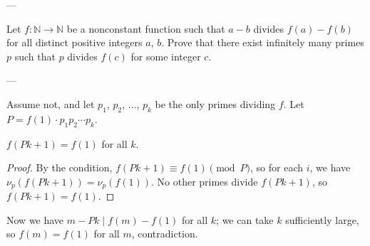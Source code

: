 
---

Let $f:\mathbb N\to\mathbb N$ be a nonconstant function such that $a-b$ divides $f(a)-f(b)$ for all distinct positive integers $a$, $b$. Prove that there exist infinitely many primes $p$ such that $p$ divides $f(c)$ for some integer $c$.

---

Assume not, and let $p_1$, $p_2$, $\ldots$, $p_k$ be the only primes dividing $f$. Let $P=f(1)\cdot p_1p_2\cdots p_k$.
\begin{claim*}
    $f(Pk+1)=f(1)$ for all $k$.
\end{claim*}
\begin{proof}
    By the condition, $f(Pk+1)\equiv f(1)\pmod P$, so for each $i$, we have $\nu_p(f(Pk+1))=\nu_p(f(1))$. No other primes divide $f(Pk+1)$, so $f(Pk+1)=f(1)$.
\end{proof}

Now we have $m-Pk\mid f(m)-f(1)$ for all $k$; we can take $k$ sufficiently large, so $f(m)=f(1)$ for all $m$, contradiction.

